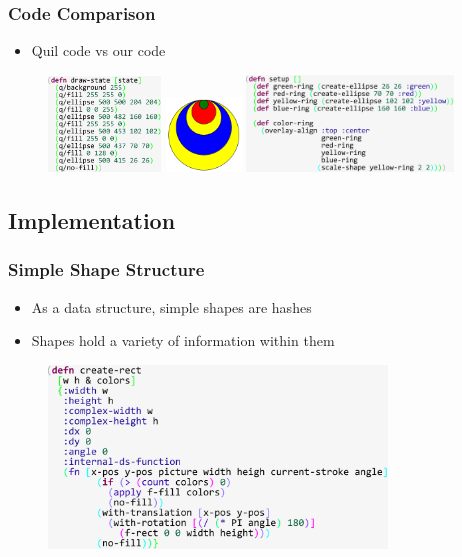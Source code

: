 \documentclass{beamer}
\begin{document}
\begin{frame}
\frametitle{Code Comparison}
	\begin{itemize}
		\item Quil code vs our code 
	\end{itemize}
	\begin{figure}
	\hspace{-0.4cm}
	\includegraphics[width=3cm]{PresentationImages/theirRingsCode.pdf}
	\hspace{0.1cm}
	\includegraphics[width=2cm]{PresentationImages/rings.png}
	\hspace{0.1cm}
	\includegraphics[width=5.5cm]{PresentationImages/ourRingsCode.pdf}
	\end{figure}
\end{frame}


\subsection{Implementation}


\begin{frame}
\frametitle{Simple Shape Structure}
	\begin{itemize}
		\item As a data structure, simple shapes are hashes
		\item Shapes hold a variety of information within them
	\end{itemize}
	\begin{figure}
		\includegraphics[width=9cm]{PresentationImages/rectHashmap.pdf}
	\end{figure}
\end{frame}
\end{document}
